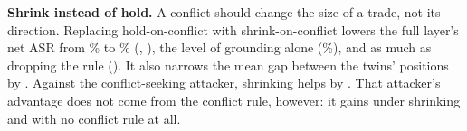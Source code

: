 \textbf{Shrink instead of hold.} A conflict should change the size of a trade, not its direction. Replacing hold-on-conflict with shrink-on-conflict lowers the full layer's net ASR from \% to \% (, ), the level of grounding alone (\%), and as much as dropping the rule (). It also narrows the mean gap between the twins' positions by . Against the conflict-seeking attacker, shrinking helps by . That attacker's advantage does not come from the conflict rule, however: it gains  under shrinking and  with no conflict rule at all.
